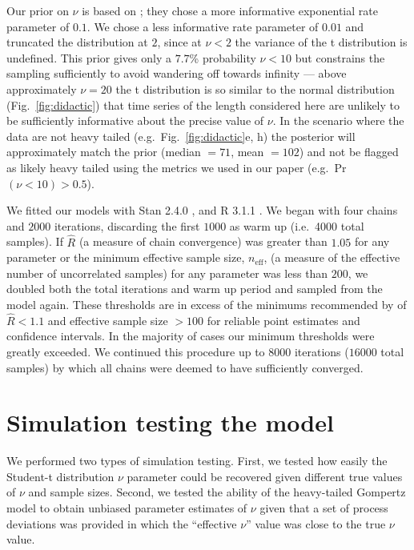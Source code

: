 Our prior on $\nu$ is based on \citet{fernandez1998}; they chose a more informative exponential rate parameter of $0.1$. We chose a less informative rate parameter of $0.01$ and truncated the distribution at $2$, since at $\nu < 2$ the variance of the t distribution is undefined. This prior gives only a $7.7$\% probability $\nu < 10$ but constrains the sampling sufficiently to avoid wandering off towards infinity --- above approximately $\nu = 20$ the t distribution is so similar to the normal distribution (Fig.~\ref{fig:didactic}) that time series of the length considered here are unlikely to be sufficiently informative about the precise value of $\nu$. In the scenario where the data are not heavy tailed (e.g.~Fig.~\ref{fig:didactic}e, h) the posterior will approximately match the prior (median $= 71$, mean $= 102$) and not be flagged as likely heavy tailed using the metrics we used in our paper (e.g.~Pr$(\nu < 10) > 0.5$).

We fitted our models with Stan 2.4.0 \citep{stan-manual2014}, and R 3.1.1 \citep{r2014}. We began with four chains and $2000$ iterations, discarding the first $1000$ as warm up (i.e.~4000 total samples). If $\hat{R}$ (a measure of chain convergence) was greater than $1.05$ for any parameter or the minimum effective sample size, $n_\mathrm{eff}$, (a measure of the effective number of uncorrelated samples) for any parameter was less than $200$, we doubled both the total iterations and warm up period and sampled from the model again. These thresholds are in excess of the minimums recommended by \citet{gelman2006a} of $\hat{R} < 1.1$ and effective sample size $> 100$ for reliable point estimates and confidence intervals. In the majority of cases our minimum thresholds were greatly exceeded. We continued this procedure up to $8000$ iterations ($16000$ total samples) by which all chains were deemed to have sufficiently converged.

\section{Simulation testing the model}

We performed two types of simulation testing. First, we tested how easily the Student-t distribution $\nu$ parameter could be recovered given different true values of $\nu$ and sample sizes. Second, we tested the ability of the heavy-tailed Gompertz model to obtain unbiased parameter estimates of $\nu$ given that a set of process deviations was provided in which the ``effective $\nu$'' value was close to the true $\nu$ value. 

